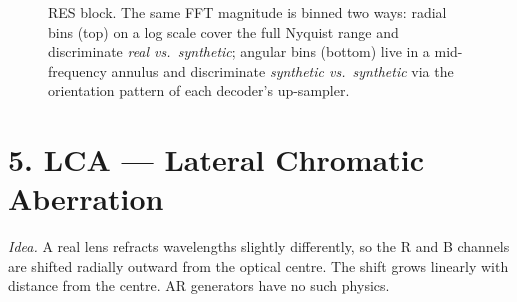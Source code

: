 \documentclass[11pt]{article}
\begin{document}
\begin{figure}[h]
\caption{RES block. The same FFT magnitude is binned two ways: radial
bins (top) on a log scale cover the full Nyquist range and discriminate
\emph{real vs.\ synthetic}; angular bins (bottom) live in a mid-frequency
annulus and discriminate \emph{synthetic vs.\ synthetic} via the
orientation pattern of each decoder's up-sampler.}
\end{figure}

\clearpage
\section*{5. LCA --- Lateral Chromatic Aberration}

\noindent
\emph{Idea.} A real lens refracts wavelengths slightly differently, so the
R and B channels are shifted radially outward from the optical centre.
The shift grows linearly with distance from the centre. AR generators
have no such physics.
\end{document}
